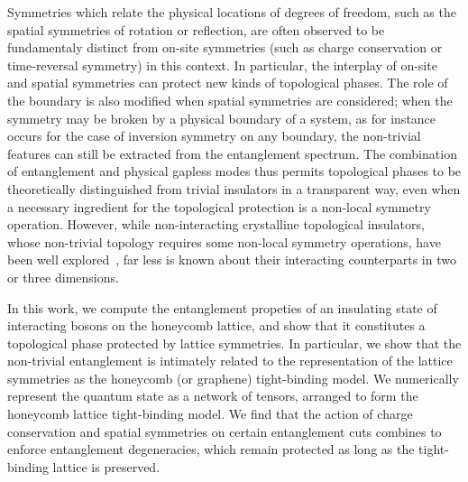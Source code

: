 Symmetries which relate the physical locations of degrees of freedom, such as the spatial symmetries of rotation or reflection, are often observed to be fundamentaly distinct from on-site symmetries (such as charge conservation or time-reversal symmetry) in this context.  In particular, the interplay of on-site and spatial symmetries can protect new kinds of topological phases.  \cite{...}
The role of the boundary is also modified when spatial symmetries are considered; when the symmetry may be broken by a physical boundary of a system, as for instance occurs for the case of inversion symmetry on any boundary, the non-trivial features can still be extracted from the entanglement spectrum.  The combination of entanglement and physical gapless modes thus permits topological phases to be theoretically distinguished from trivial insulators in a transparent way, even when a necessary ingredient for the topological protection is a non-local symmetry operation. 
However, while non-interacting crystalline topological insulators, whose non-trivial topology requires some non-local symmetry operations, have been well explored~\cite{...}, far less is known about their interacting counterparts in two or three dimensions. 

In this work, we compute the entanglement propeties of an insulating state of interacting bosons on the honeycomb lattice, and show that it constitutes a topological phase protected by lattice symmetries.  In particular, we show that the non-trivial entanglement is intimately related to the representation of the lattice symmetries as the honeycomb (or graphene) tight-binding model. We numerically represent the quantum state as a network of tensors, arranged to form the honeycomb lattice tight-binding model. We find that the action of charge conservation and spatial symmetries on certain entanglement cuts combines to enforce entanglement degeneracies, which remain protected as long as the tight-binding lattice is preserved.

